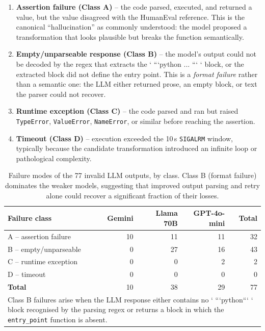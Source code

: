 \documentclass[conference]{IEEEtran}
\begin{document}
\begin{enumerate}
  \item \textbf{Assertion failure (Class A)} -- the code parsed, executed, and returned a value, but the value disagreed with the HumanEval reference. This is the canonical ``hallucination'' as commonly understood: the model proposed a transformation that looks plausible but breaks the function semantically.
  \item \textbf{Empty/unparseable response (Class B)} -- the model's output could not be decoded by the regex that extracts the ` ```python ... ``` ` block, or the extracted block did not define the entry point. This is a \emph{format failure} rather than a semantic one: the LLM either returned prose, an empty block, or text the parser could not recover.
  \item \textbf{Runtime exception (Class C)} -- the code parsed and ran but raised \texttt{TypeError}, \texttt{ValueError}, \texttt{NameError}, or similar before reaching the assertion.
  \item \textbf{Timeout (Class D)} -- execution exceeded the 10\,s \texttt{SIGALRM} window, typically because the candidate transformation introduced an infinite loop or pathological complexity.
\end{enumerate}

\begin{table}[htbp]
\caption{Failure modes of the 77 invalid LLM outputs, by class. Class B (format failure) dominates the weaker models, suggesting that improved output parsing and retry alone could recover a significant fraction of their losses.}
\label{tab:error_modes}
\centering
\footnotesize
\begin{tabular}{lrrr|r}
\hline
\textbf{Failure class} & \textbf{Gemini} & \textbf{Llama 70B} & \textbf{GPT-4o-mini} & \textbf{Total} \\
\hline
A -- assertion failure & 10 & 11 & 11 & 32 \\
B -- empty/unparseable & 0 & 27 & 16 & 43 \\
C -- runtime exception & 0 & 0 & 2 & 2 \\
D -- timeout & 0 & 0 & 0 & 0 \\
\hline
\textbf{Total} & 10 & 38 & 29 & 77 \\
\hline
\multicolumn{5}{p{0.92\columnwidth}}{\scriptsize Class B failures arise when the LLM response either contains no ` ```python``` ` block recognised by the parsing regex or returns a block in which the \texttt{entry\_point} function is absent.} \\
\end{tabular}
\end{table}
\end{document}
